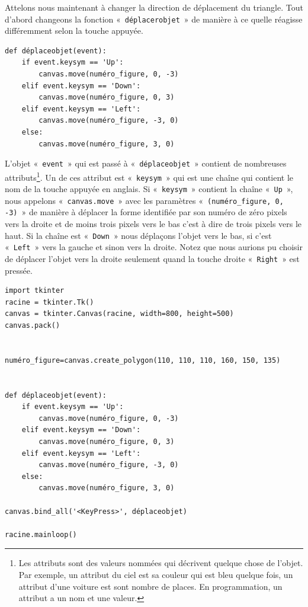 Attelons nous maintenant à changer la direction de déplacement du triangle. Tout d'abord changeons la fonction «~\texttt{déplacerobjet}~» de manière à ce quelle réagisse différemment selon la touche appuyée.
\begin{Verbatim}[frame=single,rulecolor=\color{mbleu}, label=à taper]
def déplaceobjet(event):
    if event.keysym == 'Up':
        canvas.move(numéro_figure, 0, -3)
    elif event.keysym == 'Down':
        canvas.move(numéro_figure, 0, 3)
    elif event.keysym == 'Left':
        canvas.move(numéro_figure, -3, 0)
    else:
        canvas.move(numéro_figure, 3, 0)
\end{Verbatim}

L'objet «~\texttt{event}~» qui est passé à «~\texttt{déplaceobjet}~» contient de nombreuses attributs\footnote{Les attributs sont des valeurs nommées qui décrivent quelque chose de l'objet. Par exemple, un attribut du ciel est sa couleur qui est bleu quelque fois, un attribut d'une voiture est sont nombre de places. En programmation, un attribut a un nom et une valeur.}. Un de ces attribut est «~\texttt{keysym}~» qui est une chaîne qui contient le nom de la touche appuyée en anglais. Si «~\texttt{keysym}~» contient la chaîne «~\texttt{Up}~», nous appelons «~\texttt{canvas.move}~»  avec les paramètres «~\texttt{(numéro\_figure, 0, -3)}~» de manière à déplacer la forme identifiée par son numéro de zéro pixels vers la droite et de moins trois pixels vers le bas c'est à dire de trois pixels vers le haut. Si la chaîne est «~\texttt{Down}~» nous déplaçons l'objet vers le bas, si c'est «~\texttt{Left}~» vers la gauche et sinon vers la droite. Notez que nous aurions pu choisir de déplacer l'objet vers la droite seulement quand la touche droite «~\texttt{Right}~» est pressée.

\begin{Verbatim}[frame=single,rulecolor=\color{mbleu}, label=à taper]
import tkinter
racine = tkinter.Tk()
canvas = tkinter.Canvas(racine, width=800, height=500)
canvas.pack()


numéro_figure=canvas.create_polygon(110, 110, 110, 160, 150, 135)


def déplaceobjet(event):
    if event.keysym == 'Up':
        canvas.move(numéro_figure, 0, -3)
    elif event.keysym == 'Down':
        canvas.move(numéro_figure, 0, 3)
    elif event.keysym == 'Left':
        canvas.move(numéro_figure, -3, 0)
    else:
        canvas.move(numéro_figure, 3, 0)

canvas.bind_all('<KeyPress>', déplaceobjet)

racine.mainloop()
\end{Verbatim}

